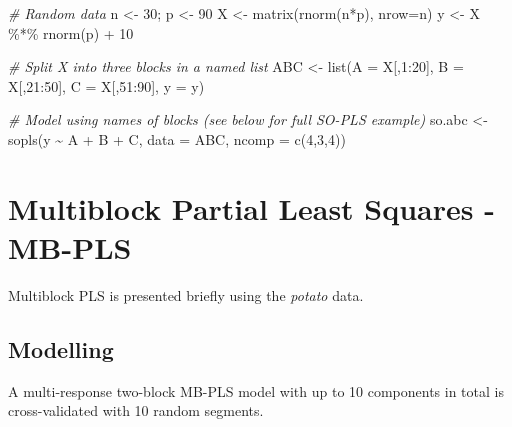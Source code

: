 \documentclass[
]{article}
\newenvironment{Shaded}{\begin{snugshade}}{\end{snugshade}}
\newcommand{\AttributeTok}[1]{\textcolor[rgb]{0.77,0.63,0.00}{#1}}
\newcommand{\CommentTok}[1]{\textcolor[rgb]{0.56,0.35,0.01}{\textit{#1}}}
\newcommand{\DecValTok}[1]{\textcolor[rgb]{0.00,0.00,0.81}{#1}}
\newcommand{\FunctionTok}[1]{\textcolor[rgb]{0.00,0.00,0.00}{#1}}
\newcommand{\NormalTok}[1]{#1}
\newcommand{\OtherTok}[1]{\textcolor[rgb]{0.56,0.35,0.01}{#1}}
\newcommand{\SpecialCharTok}[1]{\textcolor[rgb]{0.00,0.00,0.00}{#1}}
\begin{document}
\begin{Shaded}
\begin{Highlighting}[]
\CommentTok{\# Random data}
\NormalTok{n }\OtherTok{\textless{}{-}} \DecValTok{30}\NormalTok{; p }\OtherTok{\textless{}{-}} \DecValTok{90}
\NormalTok{X }\OtherTok{\textless{}{-}} \FunctionTok{matrix}\NormalTok{(}\FunctionTok{rnorm}\NormalTok{(n}\SpecialCharTok{*}\NormalTok{p), }\AttributeTok{nrow=}\NormalTok{n)}
\NormalTok{y }\OtherTok{\textless{}{-}}\NormalTok{ X }\SpecialCharTok{\%*\%} \FunctionTok{rnorm}\NormalTok{(p) }\SpecialCharTok{+} \DecValTok{10}

\CommentTok{\# Split X into three blocks in a named list}
\NormalTok{ABC }\OtherTok{\textless{}{-}} \FunctionTok{list}\NormalTok{(}\AttributeTok{A =}\NormalTok{ X[,}\DecValTok{1}\SpecialCharTok{:}\DecValTok{20}\NormalTok{], }\AttributeTok{B =}\NormalTok{ X[,}\DecValTok{21}\SpecialCharTok{:}\DecValTok{50}\NormalTok{], }\AttributeTok{C =}\NormalTok{ X[,}\DecValTok{51}\SpecialCharTok{:}\DecValTok{90}\NormalTok{], }\AttributeTok{y =}\NormalTok{ y)}

\CommentTok{\# Model using names of blocks (see below for full SO{-}PLS example)}
\NormalTok{so.abc }\OtherTok{\textless{}{-}} \FunctionTok{sopls}\NormalTok{(y }\SpecialCharTok{\textasciitilde{}}\NormalTok{ A }\SpecialCharTok{+}\NormalTok{ B }\SpecialCharTok{+}\NormalTok{ C, }\AttributeTok{data =}\NormalTok{ ABC, }\AttributeTok{ncomp =} \FunctionTok{c}\NormalTok{(}\DecValTok{4}\NormalTok{,}\DecValTok{3}\NormalTok{,}\DecValTok{4}\NormalTok{))}
\end{Highlighting}
\end{Shaded}

\hypertarget{multiblock-partial-least-squares---mb-pls}{%
\section{Multiblock Partial Least Squares -
MB-PLS}\label{multiblock-partial-least-squares---mb-pls}}

Multiblock PLS is presented briefly using the \emph{potato} data.

\hypertarget{modelling}{%
\subsection{Modelling}\label{modelling}}

A multi-response two-block MB-PLS model with up to 10 components in
total is cross-validated with 10 random segments.
\end{document}
